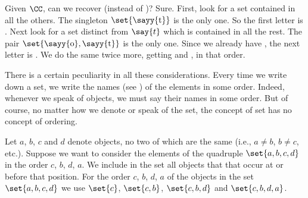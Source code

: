 Given $\CC$, can we recover  (instead of )?
Sure.
First, look for a set contained in all the others.
The singleton $\set{\text{\sayy{t}}}$ is the only one.
So the first letter is .
Next look for a set distinct from $\say{t}$ which is contained in all the rest.
The pair $\set{\text{\sayy{o}}, \text{\sayy{t}}}$ is the only one.
Since we already have , the next letter is .
We do the same twice more, getting  and , in that order.

There is a certain peculiarity in all these considerations.
Every time we write down a set, we write the names (see ) of the elements in some order.
Indeed, whenever we speak of objects, we must say their names in some order.
But of course, no matter how we denote or speak of the set, the concept of set has no concept of ordering.


Let $a$, $b$, $c$ and $d$ denote objects, no two of which are the same (i.e., $a \neq b$, $b \neq c$, etc.).
Suppose we want to consider the elements of the quadruple $\set{a, b, c, d}$ in the order $c$, $b$, $d$, $a$.
We include in the set all objects that that occur at or before that position.
For the order $c$, $b$, $d$, $a$ of the objects in the set $\set{a, b, c, d}$ we use $\set{c}$, $\set{c, b}$, $\set{c, b, d}$ and $\set{c, b, d, a}$.
